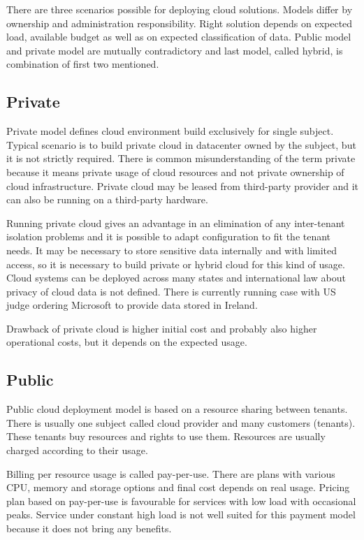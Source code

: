 
There are three scenarios possible for deploying cloud solutions. Models differ by ownership and administration responsibility. Right solution depends on expected load, available budget as well as on expected classification of data. Public model and private model are mutually contradictory and last model, called hybrid, is combination of first two mentioned.

\subsection{Private}
Private model defines cloud environment build exclusively for single subject. Typical scenario is to build private cloud in datacenter owned by the subject, but it is not strictly required. There is common misunderstanding of the term private because it means private usage of cloud resources and not private ownership of cloud infrastructure. Private cloud may be leased from third-party provider and it can also be running on a third-party hardware.

Running private cloud gives an advantage in an elimination of any inter-tenant isolation problems and it is possible to adapt configuration to fit the tenant needs.  It may be necessary to store sensitive data internally and with limited access, so it is necessary to build private or hybrid cloud for this kind of usage. 
Cloud systems can be deployed across many states and international law about privacy of cloud data is not defined.
There is currently running case with \Ac{US} judge ordering Microsoft to provide data stored in Ireland. \cite{wp-microsoft-ireland}

Drawback of private cloud is higher initial cost and probably also higher operational costs, but it depends on the expected usage.

\subsection{Public}
Public cloud deployment model is based on a resource sharing between tenants. There is usually one subject called cloud provider and many customers (tenants). These tenants buy resources and rights to use them. Resources are usually charged according to their usage.

Billing per resource usage is called pay-per-use. There are plans with various \Ac{CPU}, memory and storage options and final cost depends on real usage. Pricing plan based on pay-per-use is favourable for services with low load with occasional peaks. Service under constant high load is not well suited for this payment model because it does not bring any benefits.

